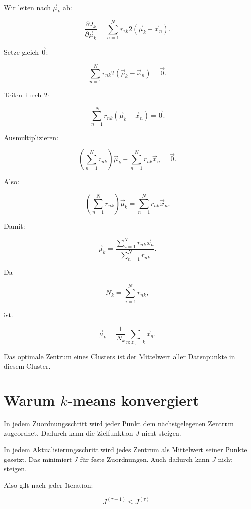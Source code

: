 Wir leiten nach \(\vec{\mu}_k\) ab:

\[
    \frac{\partial J_k}{\partial \vec{\mu}_k}
    =
    \sum_{n=1}^{N}
    r_{nk}
    2(\vec{\mu}_k-\vec{x}_n).
\]

Setze gleich \(\vec{0}\):

\[
    \sum_{n=1}^{N}
    r_{nk}
    2(\vec{\mu}_k-\vec{x}_n)
    =
    \vec{0}.
\]

Teilen durch \(2\):

\[
    \sum_{n=1}^{N}
    r_{nk}
    (\vec{\mu}_k-\vec{x}_n)
    =
    \vec{0}.
\]

Ausmultiplizieren:

\[
    \left(
        \sum_{n=1}^{N}
        r_{nk}
    \right)
    \vec{\mu}_k
    -
    \sum_{n=1}^{N}
    r_{nk}\vec{x}_n
    =
    \vec{0}.
\]

Also:

\[
    \left(
        \sum_{n=1}^{N}
        r_{nk}
    \right)
    \vec{\mu}_k
    =
    \sum_{n=1}^{N}
    r_{nk}\vec{x}_n.
\]

Damit:

\[
    \vec{\mu}_k
    =
    \frac{
        \sum_{n=1}^{N}
        r_{nk}\vec{x}_n
    }{
        \sum_{n=1}^{N}
        r_{nk}
    }.
\]

Da

\[
    N_k
    =
    \sum_{n=1}^{N}
    r_{nk},
\]

ist:

\[
    \vec{\mu}_k
    =
    \frac{1}{N_k}
    \sum_{n:z_n=k}
    \vec{x}_n.
\]

\begin{conceptbox}
Das optimale Zentrum eines Clusters ist der Mittelwert aller Datenpunkte in diesem Cluster.
\end{conceptbox}

\section{Warum \(k\)-means konvergiert}

In jedem Zuordnungsschritt wird jeder Punkt dem nächstgelegenen Zentrum zugeordnet.
Dadurch kann die Zielfunktion \(J\) nicht steigen.

In jedem Aktualisierungsschritt wird jedes Zentrum als Mittelwert seiner Punkte gesetzt.
Das minimiert \(J\) für feste Zuordnungen.
Auch dadurch kann \(J\) nicht steigen.

Also gilt nach jeder Iteration:

\[
    J^{(\tau+1)}
    \leq
    J^{(\tau)}.
\]

